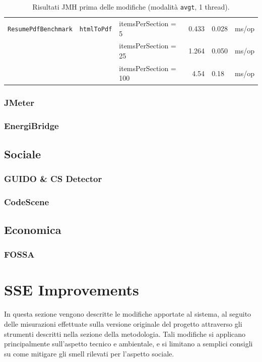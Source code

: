 \documentclass[12pt,a4paper]{article}
\begin{document}
\begin{table}[H]
\begin{tabular}{lll r@{\,$\pm$\,}l l}
            \midrule
            \texttt{ResumePdfBenchmark}  & \texttt{htmlToPdf} & itemsPerSection = 5   & 0.433 & 0.028 & ms/op \\
            &                    & itemsPerSection = 25  & 1.264 & 0.050 & ms/op \\
            &                    & itemsPerSection = 100 & 4.54  & 0.18  & ms/op \\
            \bottomrule
        \end{tabular}
        \caption{Risultati JMH prima delle modifiche (modalità \texttt{avgt}, 1 thread).}
        \label{tab:jmh-before}
    \end{table}



    \subsubsection{JMeter}




    \subsubsection{EnergiBridge}






    \subsection{Sociale}
    \subsubsection{GUIDO \& CS Detector}
    \subsubsection{CodeScene}

    \subsection{Economica}
    \subsubsection{FOSSA}

    \section{SSE Improvements}
    In questa sezione vengono descritte le modifiche apportate al sistema, al seguito delle misurazioni
    effettuate sulla versione originale del progetto attraverso gli strumenti descritti nella sezione della metodologia.
    Tali modifiche si applicano principalmente sull'aspetto tecnico e ambientale, e si limitano a semplici consigli su come mitigare gli smell rilevati per l'aspetto sociale.
\end{document}
